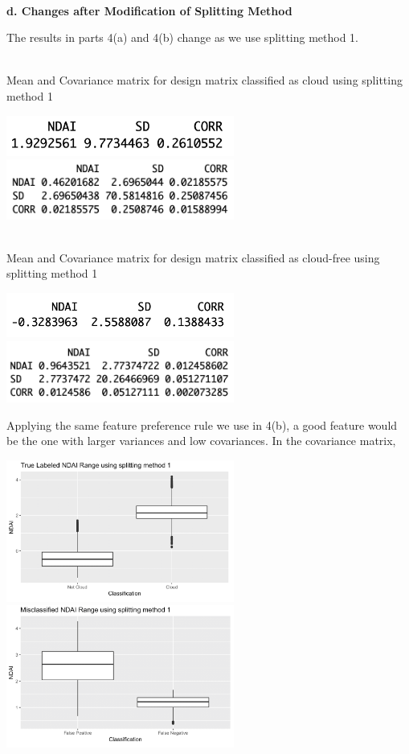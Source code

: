 \documentclass[11pt]{article}
\begin{document}
\vspace{0.3cm}
\mbox{}\\
\textbf{d. Changes after Modification of Splitting Method}

The results in parts 4(a) and 4(b) change as we use splitting method 1.  

\mbox{}\\
Mean and Covariance matrix for design matrix classified as cloud using splitting method 1

\includegraphics[width = 7.5cm]{4(d)1}
\includegraphics[width = 7.5cm]{4(d)2}

\mbox{}\\
Mean and Covariance matrix for design matrix classified as cloud-free using splitting method 1

\includegraphics[width = 7.5cm]{4(d)3}
\includegraphics[width = 7.5cm]{4(d)4}

Applying the same feature preference rule we use in 4(b), a good feature would be the one with larger variances and low covariances. In the covariance matrix, 

\includegraphics[width = 7.5cm]{4(d)ndai1}
\includegraphics[width = 7.5cm]{4(d)ndai2}
\end{document}
